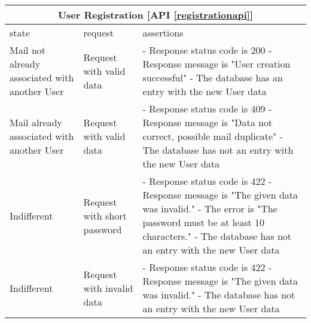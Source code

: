 \begin{center}
	\begin{tabular}{|p{}|p{}|p{}|}
		\hline
		\multicolumn{3}{c}{User Registration [API \ref{registrationapi}]}\\

		\hline
		state & request & assertions \\
		
		
		\hline
		Mail not already associated with another User &
		Request with valid data & 
		- Response status code is 200 \newline
		- Response message is "User creation successful"\newline
		- The database has an entry with the new User data
		\\
		
		\hline
		Mail already associated with another User   &
		Request with valid data & 
		- Response status code is 409 \newline
		- Response message is "Data not correct, possible mail duplicate"\newline
		- The database has not an entry with the new User data
		\\
		
		\hline
		Indifferent  &
		Request with short password & 
		- Response status code is 422 \newline
		- Response message is "The given data was invalid." \newline
		- The error is "The password must be at least 10 characters."
		- The database has not an entry with the new User data 
		\\
		
		\hline
		Indifferent  &
		Request with invalid data & 
		- Response status code is 422 \newline
		- Response message is "The given data was invalid." \newline
		- The database has not an entry with the new User data
		\\
		
		
		\hline

	\end{tabular}
\end{center}



